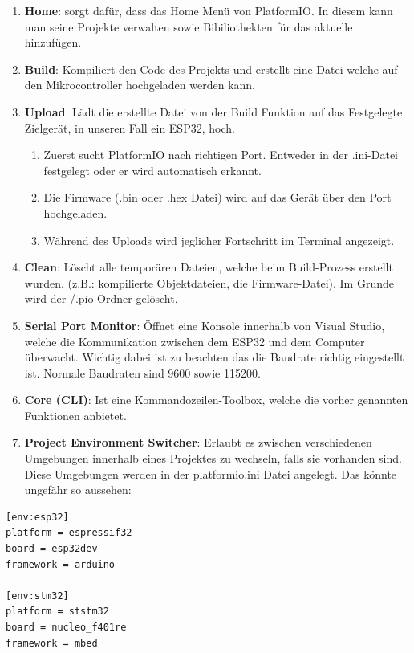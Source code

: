 \documentclass[
    headings=optiontotocandhead,%
    twoside,
    numbers=noenddot,%
    12pt, %
    titlepage, %
    parskip=full, %
    listof=leveldown, 
    numbers=noenddot, %
    a4paper,DIV=14,
    BCOR=15mm,
]{scrbook}
\providecommand{\tightlist}{%
  \setlength{\itemsep}{0pt}\setlength{\parskip}{0pt}}
\begin{document}
\begin{enumerate}
\def\labelenumi{\arabic{enumi}.}
\tightlist
\item
  \textbf{Home}: sorgt dafür, dass das Home Menü von PlatformIO. In
  diesem kann man seine Projekte verwalten sowie Bibiliothekten für das
  aktuelle hinzufügen.
\item
  \textbf{Build}: Kompiliert den Code des Projekts und erstellt eine
  Datei welche auf den Mikrocontroller hochgeladen werden kann.
\item
  \textbf{Upload}: Lädt die erstellte Datei von der Build Funktion auf
  das Festgelegte Zielgerät, in unseren Fall ein ESP32, hoch.

  \begin{enumerate}
  \def\labelenumii{\arabic{enumii}.}
  \tightlist
  \item
    Zuerst sucht PlatformIO nach richtigen Port. Entweder in der
    .ini-Datei festgelegt oder er wird automatisch erkannt.
  \item
    Die Firmware (.bin oder .hex Datei) wird auf das Gerät über den Port
    hochgeladen.
  \item
    Während des Uploads wird jeglicher Fortschritt im Terminal
    angezeigt.
  \end{enumerate}
\item
  \textbf{Clean}: Löscht alle temporären Dateien, welche beim
  Build-Prozess erstellt wurden. (z.B.: kompilierte Objektdateien, die
  Firmware-Datei). Im Grunde wird der /.pio Ordner gelöscht.
\item
  \textbf{Serial Port Monitor}: Öffnet eine Konsole innerhalb von Visual
  Studio, welche die Kommunikation zwischen dem ESP32 und dem Computer
  überwacht. Wichtig dabei ist zu beachten das die Baudrate richtig
  eingestellt ist. Normale Baudraten sind 9600 sowie 115200.
\item
  \textbf{Core (CLI)}: Ist eine Kommandozeilen-Toolbox, welche die
  vorher genannten Funktionen anbietet.
\item
  \textbf{Project Environment Switcher}: Erlaubt es zwischen
  verschiedenen Umgebungen innerhalb eines Projektes zu wechseln, falls
  sie vorhanden sind. Diese Umgebungen werden in der platformio.ini
  Datei angelegt. Das könnte ungefähr so aussehen:
\end{enumerate}

\begin{lstlisting}[caption={Beispiel Von Mehreren Umgebungen}]
[env:esp32]
platform = espressif32
board = esp32dev
framework = arduino

[env:stm32]
platform = ststm32
board = nucleo_f401re
framework = mbed
\end{lstlisting}
\end{document}
